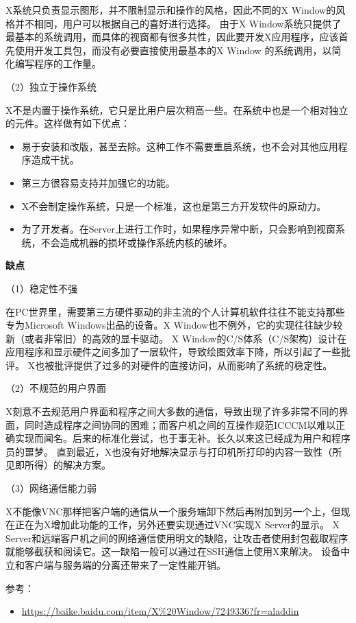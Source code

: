 \documentclass[doctor,openright,twoside]{sjtuthesis}
\providecommand{\tightlist}{%
    \setlength{\itemsep}{0pt}\setlength{\parskip}{0pt}}
\theoremstyle{plain}
\theoremstyle{definition}
\theoremstyle{remark}
\theoremstyle{ocrenumbox}
\theoremstyle{plain}
\begin{document}
X系统只负责显示图形，并不限制显示和操作的风格，因此不同的X Window的风格并不相同，用户可以根据自己的喜好进行选择。
由于X Window系统只提供了最基本的系统调用，而具体的视窗都有很多共性，因此要开发X应用程序，应该首先使用开发工具包，而没有必要直接使用最基本的X Window 的系统调用，以简化编写程序的工作量。

（2）独立于操作系统

X不是内置于操作系统，它只是比用户层次稍高一些。在系统中也是一个相对独立的元件。这样做有如下优点：

\begin{itemize}
\tightlist
\item
  易于安装和改版，甚至去除。这种工作不需要重启系统，也不会对其他应用程序造成干扰。
\item
  第三方很容易支持并加强它的功能。
\item
  X不会制定操作系统，只是一个标准，这也是第三方开发软件的原动力。
\item
  为了开发者。在Server上进行工作时，如果程序异常中断，只会影响到视窗系统，不会造成机器的损坏或操作系统内核的破坏。
\end{itemize}

\textbf{缺点}

（1）稳定性不强

在PC世界里，需要第三方硬件驱动的非主流的个人计算机软件往往不能支持那些专为Microsoft Windows出品的设备。X Window也不例外，它的实现往往缺少较新（或者非常旧）的高效的显卡驱动。
X Window的C/S体系（C/S架构）设计在应用程序和显示硬件之间多加了一层软件，导致绘图效率下降，所以引起了一些批评。
X也被批评提供了过多的对硬件的直接访问，从而影响了系统的稳定性。

（2）不规范的用户界面

X刻意不去规范用户界面和程序之间大多数的通信，导致出现了许多非常不同的界面，同时造成程序之间协同的困难；而客户机之间的互操作规范ICCCM以难以正确实现而闻名。后来的标准化尝试，也于事无补。长久以来这已经成为用户和程序员的噩梦。
直到最近，X也没有好地解决显示与打印机所打印的内容一致性（所见即所得）的解决方案。

（3）网络通信能力弱

X不能像VNC那样把客户端的通信从一个服务端卸下然后再附加到另一个上，但现在正在为X增加此功能的工作，另外还要实现通过VNC实现X Server的显示。
X Server和远端客户机之间的网络通信使用明文的缺陷，让攻击者使用封包截取程序就能够截获和阅读它。这一缺陷一般可以通过在SSH通信上使用X来解决。
设备中立和客户端与服务端的分离还带来了一定性能开销。

参考：

\begin{itemize}
\tightlist
\item
  \url{https://baike.baidu.com/item/X\%20Window/7249336?fr=aladdin}
\end{itemize}
\end{document}
